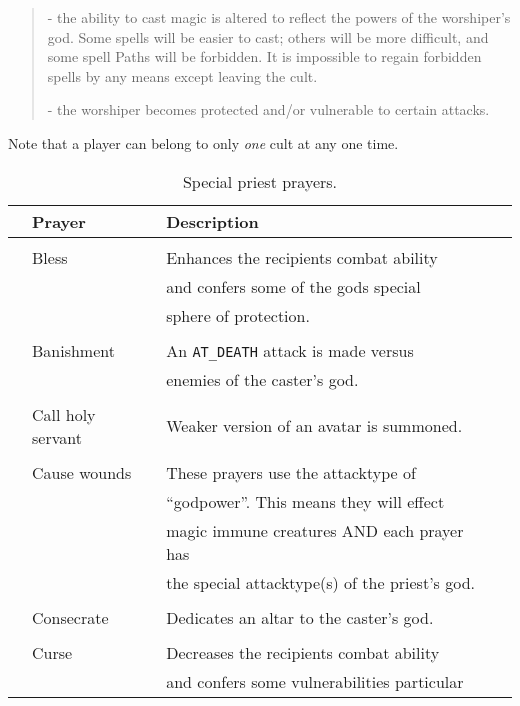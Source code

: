 {{{\begin{quote}
- the ability to cast magic is altered to reflect the powers
of the worshiper's god. Some spells will be easier to cast; others
will be more difficult, and some spell Paths will be forbidden.
It is impossible to regain forbidden spells by any means except
leaving the cult.

- the worshiper becomes protected and/or vulnerable to certain attacks. 
\end{quote}
Note that a player can belong to only {\em one} cult at any one time.

\begin{table}
\begin{center}
\footnotesize
\caption{Special priest prayers. \label{tab:priest_prayer}}  
\vskip 12pt
\begin{tabular}{|p{0.5cm}llp{0.5cm}|} \hline
& Prayer & Description & \\ \hline\hline  
 & & & \\ 
    &    Bless                   &  Enhances the recipients combat ability & \\ 
    &                                 &  and confers some of the gods special & \\
    &					& sphere of protection. & \\ 
 & & & \\ 
   &     Banishment 		&  An {\tt AT\_DEATH}\tablenotemark{1} attack is made versus & \\
	& & enemies of the caster's god. &  \\
 & & & \\ 
   &     Call holy servant     &  Weaker version of an avatar is summoned.& \\
 & & & \\ 
   &     Cause wounds	    &  These prayers use the attacktype of & \\
   &                                  &  ``godpower''. This means they will effect & \\
&				     & magic immune creatures AND each prayer has & \\
&				     & the special attacktype(s) of the priest's god. & \\
 & & & \\ 
&        Consecrate            &  Dedicates an altar to the caster's god.& \\ 
 & & & \\ 
&        Curse                  &  Decreases the recipients combat ability & \\ 
&                                     &  and confers some vulnerabilities particular & \\

\end{tabular}
\end{center}
\end{table}}}}
